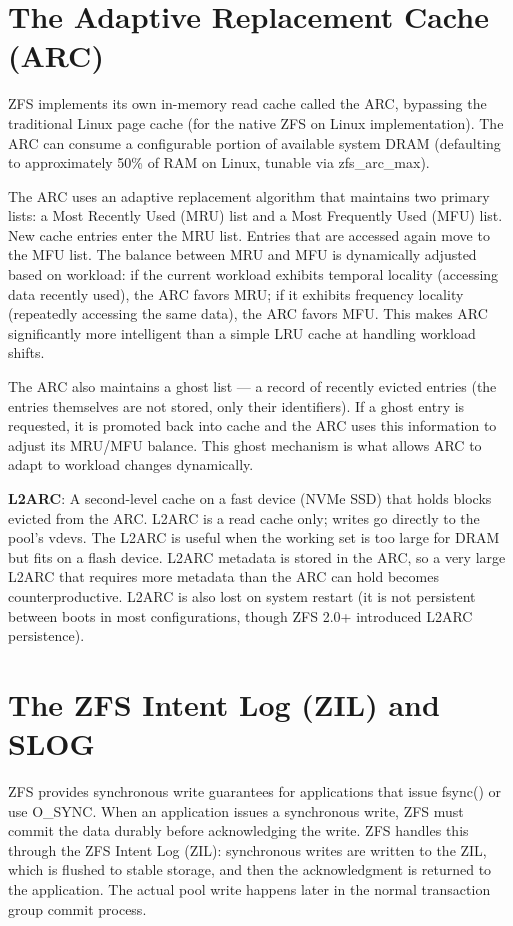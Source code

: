 \section{The Adaptive Replacement Cache (ARC)}
ZFS implements its own in-memory read cache called the ARC, bypassing the traditional Linux page cache (for the native ZFS on Linux implementation). The ARC can consume a configurable portion of available system DRAM (defaulting to approximately 50\% of RAM on Linux, tunable via zfs\_arc\_max).

The ARC uses an adaptive replacement algorithm that maintains two primary lists: a Most Recently Used (MRU) list and a Most Frequently Used (MFU) list. New cache entries enter the MRU list. Entries that are accessed again move to the MFU list. The balance between MRU and MFU is dynamically adjusted based on workload: if the current workload exhibits temporal locality (accessing data recently used), the ARC favors MRU; if it exhibits frequency locality (repeatedly accessing the same data), the ARC favors MFU. This makes ARC significantly more intelligent than a simple LRU cache at handling workload shifts.

The ARC also maintains a ghost list --- a record of recently evicted entries (the entries themselves are not stored, only their identifiers). If a ghost entry is requested, it is promoted back into cache and the ARC uses this information to adjust its MRU/MFU balance. This ghost mechanism is what allows ARC to adapt to workload changes dynamically.

\textbf{L2ARC}: A second-level cache on a fast device (NVMe SSD) that holds blocks evicted from the ARC. L2ARC is a read cache only; writes go directly to the pool's vdevs. The L2ARC is useful when the working set is too large for DRAM but fits on a flash device. L2ARC metadata is stored in the ARC, so a very large L2ARC that requires more metadata than the ARC can hold becomes counterproductive. L2ARC is also lost on system restart (it is not persistent between boots in most configurations, though ZFS 2.0+ introduced L2ARC persistence).

\section{The ZFS Intent Log (ZIL) and SLOG}
ZFS provides synchronous write guarantees for applications that issue fsync() or use O\_SYNC. When an application issues a synchronous write, ZFS must commit the data durably before acknowledging the write. ZFS handles this through the ZFS Intent Log (ZIL): synchronous writes are written to the ZIL, which is flushed to stable storage, and then the acknowledgment is returned to the application. The actual pool write happens later in the normal transaction group commit process.

